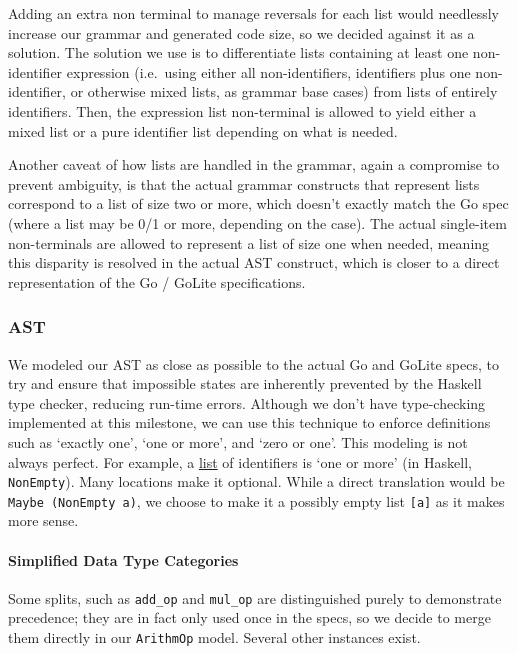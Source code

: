 \documentclass[11pt]{article}
\begin{document}
Adding an extra non terminal to manage reversals for each list would
needlessly increase our grammar and generated code size, so we decided
against it as a solution. The solution we use is to differentiate
lists containing at least one non-identifier expression (i.e.\ using
either all non-identifiers, identifiers plus one non-identifier, or
otherwise mixed lists, as grammar base cases) from lists of entirely
identifiers. Then, the expression list non-terminal is allowed to
yield either a mixed list or a pure identifier list depending on what
is needed.

Another caveat of how lists are handled in the grammar, again a
compromise to prevent ambiguity, is that the actual grammar constructs
that represent lists correspond to a list of size two or more, which
doesn't exactly match the Go spec (where a list may be 0/1 or more,
depending on the case). The actual single-item non-terminals are
allowed to represent a list of size one when needed, meaning this
disparity is resolved in the actual AST construct, which is closer to
a direct representation of the Go / GoLite specifications.
\subsubsection{AST}
We modeled our AST as close as possible to the actual Go and GoLite
specs, to try and ensure that impossible states are inherently
prevented by the Haskell type checker, reducing run-time errors.
Although we don't have type-checking implemented at this milestone, we
can use this technique to enforce definitions such as `exactly one',
`one or more', and `zero or one'. This modeling is not always
perfect. For example, a
\href{https://golang.org/ref/spec\#IdentifierList}{list} of
identifiers is `one or more' (in Haskell, \texttt{NonEmpty}). Many
locations make it optional. While a direct translation would be
\texttt{Maybe (NonEmpty a)}, we choose to make it a possibly empty
list \texttt{[a]} as it makes more sense.
\paragraph{Simplified Data Type Categories}
Some splits, such as \texttt{add\_op} and \texttt{mul\_op} are
distinguished purely to demonstrate precedence; they are in fact only
used once in the specs, so we decide to merge them directly in our
\texttt{ArithmOp} model. Several other instances exist.
\end{document}
